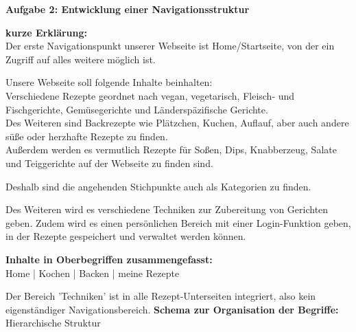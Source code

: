 \documentclass[parskip,10pt,abstracton]{scrartcl}
\renewcommand*{\maketitle}{%
	{\centering\LARGE\sffamily\bfseries Aufgabe 2: Entwicklung einer Navigationsstruktur \par}
	\vspace{3em}
}
\begin{document}
\maketitle


\textbf{kurze Erklärung:}\\
Der erste Navigationspunkt unserer Webseite ist Home/Startseite, von der ein Zugriff auf alles weitere möglich ist.

Unsere Webseite soll folgende Inhalte beinhalten:\\
Verschiedene Rezepte geordnet nach vegan, vegetarisch, Fleisch- und Fischgerichte, Gemüsegerichte und Länderspäzifische Gerichte. \\
Des Weiteren sind Backrezepte wie Plätzchen, Kuchen, Auflauf, aber auch andere süße oder herzhafte Rezepte zu finden. \\
Außerdem werden es vermutlich Rezepte für Soßen, Dips, Knabberzeug, Salate und Teiggerichte auf der Webseite zu finden sind. 

Deshalb sind die angehenden Stichpunkte auch als Kategorien zu finden. 

Des Weiteren wird es verschiedene Techniken zur Zubereitung von Gerichten geben. 
Zudem wird es einen persönlichen Bereich mit einer Login-Funktion geben, in der Rezepte gespeichert und verwaltet werden können.



\textbf{Inhalte in Oberbegriffen zusammengefasst:} \\
Home | Kochen | Backen | meine Rezepte

Der Bereich 'Techniken' ist in alle Rezept-Unterseiten integriert, also kein eigenständiger Navigationsbereich.
\newpage
\textbf{Schema zur Organisation der Begriffe:}\\
Hierarchische Struktur



\end{document}
